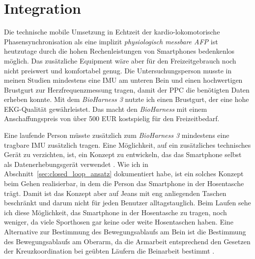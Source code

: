 
\section{Integration} %
\label{sec:integration}

Die technische mobile Umsetzung in Echtzeit der kardio-lokomotorische Phasensynchronisation als eine implizit \emph{physiologisch messbare \ac{AFP}} ist heutzutage durch die hohen Rechenleistungen von Smartphones bedenkenlos möglich. Das zusätzliche Equipment wäre aber für den Freizeitgebrauch noch nicht preiswert und komfortabel genug. Die Untersuchungsperson musste in meinen Studien mindestens eine \ac{IMU} am unteren Bein und einen hochwertigen Brustgurt zur Herzfrequenzmessung tragen, damit der \ac{PPC} die benötigten Daten erheben konnte. Mit dem \emph{BioHarness 3} nutzte ich einen Brustgurt, der eine hohe \ac{EKG}-Qualität gewährleistet. Das macht den \emph{BioHarness} mit einem Anschaffungspreis von über 500 EUR kostspielig für den Freizeitbedarf. 

Eine laufende Person müsste zusätzlich zum \emph{BioHarness 3} mindestens eine tragbare \ac{IMU} zusätzlich tragen. Eine Möglichkeit, auf ein zusätzliches technisches Gerät zu verzichten, ist, ein Konzept zu entwickeln, das das Smartphone selbst als Datenerhebungsgerät verwendet \citep[][]{Strohrmann2013, Strohrmann2014}. Wie ich in Abschnitt~\ref{sec:closed_loop_ansatz} dokumentiert habe, ist ein solches Konzept beim Gehen realisierbar, in dem die Person das Smartphone in der Hosentasche trägt. Damit ist das Konzept aber auf Jeans mit eng anliegenden Taschen beschränkt und darum nicht für jeden Benutzer alltagstauglich. Beim Laufen sehe ich diese Möglichkeit, das Smartphone in der Hosentasche zu tragen, noch weniger, da viele Sporthosen gar keine oder weite Hosentaschen haben. Eine Alternative zur Bestimmung des Bewegungsablaufs am Bein ist die Bestimmung des Bewegungsablaufs am Oberarm, da die Armarbeit entsprechend den Gesetzen der Kreuzkoordination bei geübten Läufern die Beinarbeit bestimmt \citep[][S.~70]{Marquardt2011}.

